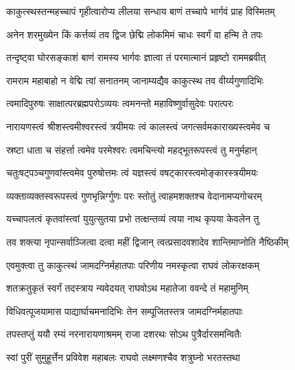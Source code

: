 \twolineshloka
{काकुत्स्थस्तन्महच्चापं गृहीत्वारोप्य लीलया}
{सन्धाय बाणं तच्चापे भार्गवं प्राह विस्मितम्}%


\twolineshloka
{अनेन शरमुख्येन किं कर्त्तव्यं तव द्विज}
{छेद्मि लोकमिमं चाधः स्वर्गं वा हन्मि ते तपः}%


\twolineshloka
{तन्दृष्ट्वा घोरसङ्काशं बाणं रामस्य भार्गवः}
{ज्ञात्वा तं परमात्मानं प्रहृष्टो राममब्रवीत्}%


\twolineshloka
{रामराम महाबाहो न वेद्मि त्वां सनातनम्}
{जानाम्यद्यैव काकुत्स्थ तव वीर्य्यगुणादिभिः}%

\twolineshloka
{त्वमादिपुरुषः साक्षात्परब्रह्मपरोऽव्ययः}
{त्वमनन्तो महाविष्णुर्वासुदेवः परात्परः}%

\twolineshloka
{नारायणस्त्वं श्रीशस्त्वमीश्वरस्त्वं त्रयीमयः}
{त्वं कालस्त्वं जगत्सर्वमकाराख्यस्त्वमेव च}%

\twolineshloka
{स्रष्टा धाता च संहर्त्ता त्वमेव परमेश्वरः}
{त्वमचिन्त्यो महद्भूतरूपस्त्वं तु मनुर्महान्}%

\twolineshloka
{चतुःषट्पञ्चगुणवांस्त्वमेव पुरुषोत्तमः}
{त्वं यज्ञस्त्वं वषट्कारस्त्वमोङ्कारस्त्रयीमयः}%

\twolineshloka
{व्यक्ताव्यक्तस्वरूपस्त्वं गुणभृन्निर्ग्गुणः परः}
{स्तोतुं त्वाहमशक्तश्च वेदानामप्यगोचरम्}%

\twolineshloka
{यच्चापलत्वं कृतवांस्त्वां युयुत्सुतया प्रभो}
{तत्क्षन्तव्यं त्वया नाथ कृपया केवलेन तु}%

\twolineshloka
{तव शक्त्या नृपान्सर्वाञ्जित्वा दत्वा महीं द्विजान्}
{त्वत्प्रसादवशादेव शान्तिमाप्नोति नैष्ठिकीम्}%


\twolineshloka
{एवमुक्त्वा तु काकुत्स्थं जामदग्निर्महातपाः}
{परिणीय नमस्कृत्वा राघवं लोकरक्षकम्}%

\twolineshloka
{शतक्रतुकृतं स्वर्गं तदस्त्राय न्यवेदयत्}
{राघवोऽथ महातेजा ववन्दे तं महामुनिम्}%

\twolineshloka
{विधिवत्पूजयामास पाद्यार्घाचमनादिभिः}
{तेन सम्पूजितस्तत्र जामदग्निर्महातपाः}%

\twolineshloka
{तपस्तप्तुं ययौ रम्यं नरनारायणाश्रमम्}
{राजा दशरथः सोऽथ पुत्रैर्दारसमन्वितैः}%

\twolineshloka
{स्वां पुरीं सुमुहूर्त्तेन प्रविवेश महाबलः}
{राघवो लक्ष्मणश्चैव शत्रुघ्नो भरतस्तथा}%

